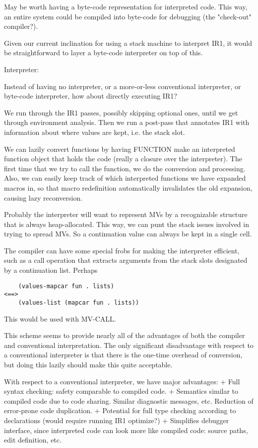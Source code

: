 
May be worth having a byte-code representation for interpreted code.  This way,
an entire system could be compiled into byte-code for debugging (the
"check-out" compiler?).

Given our current inclination for using a stack machine to interpret IR1, it
would be straightforward to layer a byte-code interpreter on top of this.


Interpreter:

Instead of having no interpreter, or a more-or-less conventional interpreter,
or byte-code interpreter, how about directly executing IR1?

We run through the IR1 passes, possibly skipping optional ones, until we get
through environment analysis.  Then we run a post-pass that annotates IR1 with
information about where values are kept, i.e. the stack slot.

We can lazily convert functions by having FUNCTION make an interpreted function
object that holds the code (really a closure over the interpreter).  The first
time that we try to call the function, we do the conversion and processing.
Also, we can easily keep track of which interpreted functions we have expanded
macros in, so that macro redefinition automatically invalidates the old
expansion, causing lazy reconversion.

Probably the interpreter will want to represent MVs by a recognizable structure
that is always heap-allocated.  This way, we can punt the stack issues involved
in trying to spread MVs.  So a continuation value can always be kept in a
single cell.

The compiler can have some special frobs for making the interpreter efficient,
such as a call operation that extracts arguments from the stack
slots designated by a continuation list.  Perhaps 
\begin{verbatim}
    (values-mapcar fun . lists)
<==>
    (values-list (mapcar fun . lists))
\end{verbatim}
This would be used with MV-CALL.


This scheme seems to provide nearly all of the advantages of both the compiler
and conventional interpretation.  The only significant disadvantage with
respect to a conventional interpreter is that there is the one-time overhead of
conversion, but doing this lazily should make this quite acceptable.

With respect to a conventional interpreter, we have major advantages:
 + Full syntax checking: safety comparable to compiled code.
 + Semantics similar to compiled code due to code sharing.  Similar diagnostic
   messages, etc.  Reduction of error-prone code duplication.
 + Potential for full type checking according to declarations (would require
   running IR1 optimize?)
 + Simplifies debugger interface, since interpreted code can look more like
   compiled code: source paths, edit definition, etc.

